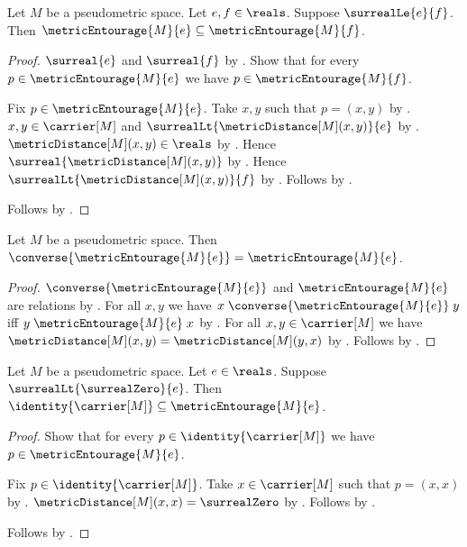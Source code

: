 \begin{proposition}\label{metric_entourage_monotone}
    Let $M$ be a pseudometric space.
    Let $e,f\in\reals$.
    Suppose $\surrealLe{e}{f}$.
    Then $\metricEntourage{M}{e}\subseteq\metricEntourage{M}{f}$.
\end{proposition}
\begin{proof}
    $\surreal{e}$ and $\surreal{f}$
        by .
    Show that for every $p\in\metricEntourage{M}{e}$ we have
        $p\in\metricEntourage{M}{f}$.
    \begin{subproof}
        Fix $p\in\metricEntourage{M}{e}$.
        Take $x,y$ such that $p=(x,y)$
            by .
        $x,y\in\carrier[M]$ and
            $\surrealLt{\metricDistance[M](x,y)}{e}$
            by .
        $\metricDistance[M](x,y)\in\reals$
            by .
        Hence $\surreal{\metricDistance[M](x,y)}$
            by .
        Hence $\surrealLt{\metricDistance[M](x,y)}{f}$
            by .
        Follows by .
    \end{subproof}
    Follows by .
\end{proof}

\begin{proposition}\label{metric_entourage_symmetric}
    Let $M$ be a pseudometric space.
    Then
        $\converse{\metricEntourage{M}{e}}
            =\metricEntourage{M}{e}$.
\end{proposition}
\begin{proof}
    $\converse{\metricEntourage{M}{e}}$ and
        $\metricEntourage{M}{e}$ are relations
        by
        .
    For all $x,y$ we have
        $x\mathrel{\converse{\metricEntourage{M}{e}}}y$ iff
        $y\mathrel{\metricEntourage{M}{e}}x$
        by .
    For all $x,y\in\carrier[M]$ we have
        $\metricDistance[M](x,y)=\metricDistance[M](y,x)$
        by .
    Follows by .
\end{proof}

\begin{proposition}\label{metric_entourage_diagonal}
    Let $M$ be a pseudometric space.
    Let $e\in\reals$.
    Suppose $\surrealLt{\surrealZero}{e}$.
    Then
        $\identity{\carrier[M]}\subseteq\metricEntourage{M}{e}$.
\end{proposition}
\begin{proof}
    Show that for every $p\in\identity{\carrier[M]}$ we have
        $p\in\metricEntourage{M}{e}$.
    \begin{subproof}
        Fix $p\in\identity{\carrier[M]}$.
        Take $x\in\carrier[M]$ such that $p=(x,x)$
            by .
        $\metricDistance[M](x,x)=\surrealZero$
            by .
        Follows by .
    \end{subproof}
    Follows by .
\end{proof}

